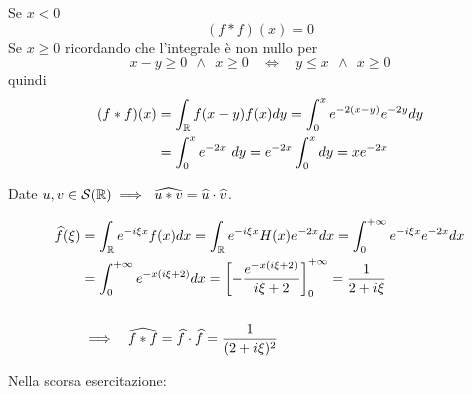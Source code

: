 Se $x < 0$
\begin{equation*}
(f*f)(x) = 0
\end{equation*}
Se $x \geq 0$ ricordando che l'integrale è non nullo per 
\begin{equation*}
x - y \geq 0\ \ \land \ \ x \geq 0\ \ \ \ \iff \ \ \ \ y \leq x\ \ \land \ \ x \geq 0
\end{equation*}
quindi
\begin{align*}
(f*f)(x) & = \int_{\mathbb{R}} f(x - y) f(x) dy = \int^{x}_{0} e^{- 2(x - y)} e^{- 2y} dy\\
 & = \int^{x}_{0} e^{- 2x} \ dy = e^{- 2x}\int^{x}_{0} dy = xe^{- 2x}
\end{align*}
\begin{thm}
Date $\displaystyle u, v\in \mathcal{S} (\mathbb{R}) \implies \ \widehat{u*v} = \widehat{u} \cdot \widehat{v}$.
\end{thm}
\begin{align*}
\widehat{f}(\xi) & = \int_{\mathbb{R}} e^{- i\xi x} f(x) dx = \int_{\mathbb{R}} e^{- i\xi x} H(x) e^{- 2x} dx = \int^{+ \infty}_{0} e^{- i\xi x} e^{- 2x} dx\\
 & = \int^{+ \infty}_{0} e^{- x(i\xi + 2)} dx = \left[ - \frac{e^{- x(i\xi + 2)}}{i\xi + 2}\right]^{+ \infty}_{0} = \frac{1}{2 + i\xi}\\
 & \\
 & \implies \ \ \widehat{f*f} = \widehat{f} \cdot \widehat{f} = \frac{1}{(2 + i\xi)^{2}}
\end{align*}
\Soluzione

Nella scorsa esercitazione:

